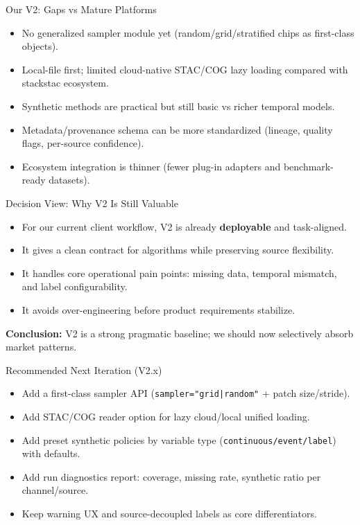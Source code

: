 \documentclass{beamer}
\begin{document}
\begin{frame}{Our V2: Gaps vs Mature Platforms}
\begin{itemize}
  \item No generalized sampler module yet (random/grid/stratified chips as first-class objects).
  \item Local-file first; limited cloud-native STAC/COG lazy loading compared with stackstac ecosystem.
  \item Synthetic methods are practical but still basic vs richer temporal models.
  \item Metadata/provenance schema can be more standardized (lineage, quality flags, per-source confidence).
  \item Ecosystem integration is thinner (fewer plug-in adapters and benchmark-ready datasets).
\end{itemize}
\end{frame}

\begin{frame}{Decision View: Why V2 Is Still Valuable}
\begin{itemize}
  \item For our current client workflow, V2 is already \textbf{deployable} and task-aligned.
  \item It gives a clean contract for algorithms while preserving source flexibility.
  \item It handles core operational pain points: missing data, temporal mismatch, and label configurability.
  \item It avoids over-engineering before product requirements stabilize.
\end{itemize}
\vspace{0.4em}
\textbf{Conclusion:} V2 is a strong pragmatic baseline; we should now selectively absorb market patterns.
\end{frame}

\begin{frame}{Recommended Next Iteration (V2.x)}
\begin{itemize}
  \item Add a first-class sampler API (\texttt{sampler="grid|random"} + patch size/stride).
  \item Add STAC/COG reader option for lazy cloud/local unified loading.
  \item Add preset synthetic policies by variable type (\texttt{continuous/event/label}) with defaults.
  \item Add run diagnostics report: coverage, missing rate, synthetic ratio per channel/source.
  \item Keep warning UX and source-decoupled labels as core differentiators.
\end{itemize}
\end{frame}
\end{document}
